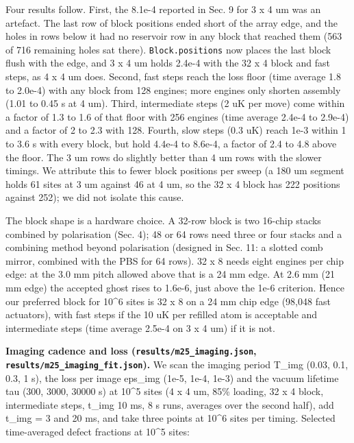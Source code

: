 Four results follow. First, the 8.1e-4 reported in Sec. 9 for 3 x 4 um
was an artefact. The last row of block positions ended short of the
array edge, and the holes in rows below it had no reservoir row in any
block that reached them (563 of 716 remaining holes sat there).
\texttt{Block.positions} now places the last block flush with the edge,
and 3 x 4 um holds 2.4e-4 with the 32 x 4 block and fast steps, as 4 x 4
um does. Second, fast steps reach the loss floor (time average 1.8 to
2.0e-4) with any block from 128 engines; more engines only shorten
assembly (1.01 to 0.45 s at 4 um). Third, intermediate steps (2 uK per
move) come within a factor of 1.3 to 1.6 of that floor with 256 engines
(time average 2.4e-4 to 2.9e-4) and a factor of 2 to 2.3 with 128.
Fourth, slow steps (0.3 uK) reach 1e-3 within 1 to 3.6 s with every
block, but hold 4.4e-4 to 8.6e-4, a factor of 2.4 to 4.8 above the
floor. The 3 um rows do slightly better than 4 um rows with the slower
timings. We attribute this to fewer block positions per sweep (a 180 um
segment holds 61 sites at 3 um against 46 at 4 um, so the 32 x 4 block
has 222 positions against 252); we did not isolate this cause.

The block shape is a hardware choice. A 32-row block is two 16-chip
stacks combined by polarisation (Sec. 4); 48 or 64 rows need three or
four stacks and a combining method beyond polarisation (designed in Sec.
11: a slotted comb mirror, combined with the PBS for 64 rows). 32 x 8
needs eight engines per chip edge: at the 3.0 mm pitch allowed above
that is a 24 mm edge. At 2.6 mm (21 mm edge) the accepted ghost rises to
1.6e-6, just above the 1e-6 criterion. Hence our preferred block for
10\^{}6 sites is 32 x 8 on a 24 mm chip edge (98,048 fast actuators),
with fast steps if the 10 uK per refilled atom is acceptable and
intermediate steps (time average 2.5e-4 on 3 x 4 um) if it is not.

\textbf{Imaging cadence and loss (\texttt{results/m25\_imaging.json},
\texttt{results/m25\_imaging\_fit.json}).} We scan the imaging period
T\_img (0.03, 0.1, 0.3, 1 s), the loss per image eps\_img (1e-5, 1e-4,
1e-3) and the vacuum lifetime tau (300, 3000, 30000 s) at 10\^{}5 sites
(4 x 4 um, 85\% loading, 32 x 4 block, intermediate steps, t\_img 10 ms,
8 s runs, averages over the second half), add t\_img = 3 and 20 ms, and
take three points at 10\^{}6 sites per timing. Selected time-averaged
defect fractions at 10\^{}5 sites:

